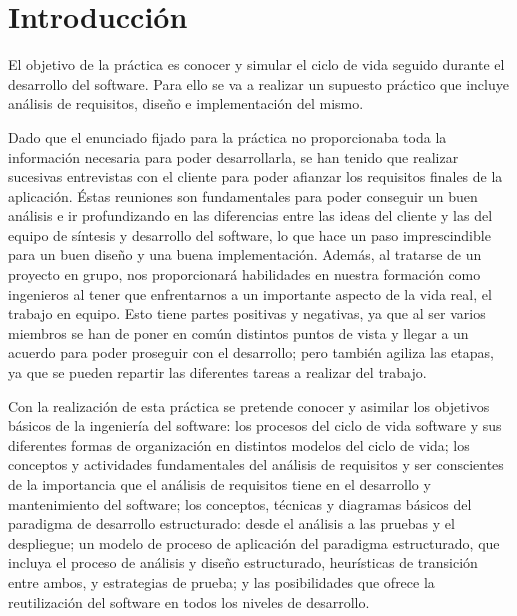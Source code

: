 \documentclass[12pt,a4paper,spanish,twoside]{article}
\begin{document}

\tableofcontents
\newpage
\section{Introducción}
El objetivo de la práctica es conocer y simular el ciclo de vida seguido
durante el desarrollo del software. Para ello se va a realizar un supuesto
práctico que incluye análisis de requisitos, diseño e implementación del
mismo. 

Dado que el enunciado fijado para la práctica no proporcionaba toda la
información necesaria para poder desarrollarla, se han tenido que realizar
sucesivas entrevistas con el cliente para poder afianzar los requisitos finales
de la aplicación. Éstas reuniones son fundamentales para poder conseguir un
buen análisis e ir profundizando en las diferencias entre las ideas del
cliente y las del equipo de síntesis y desarrollo del software, lo que hace
un paso imprescindible para un buen diseño y una buena
implementación. Además, al tratarse de un proyecto en grupo, nos
proporcionará habilidades en nuestra formación como ingenieros al tener que
enfrentarnos a un importante aspecto de la vida real, el trabajo en
equipo. Esto tiene partes positivas y negativas, ya que al ser varios
miembros se han de poner en común distintos puntos de vista y llegar a un
acuerdo para poder proseguir con el desarrollo; pero también agiliza las
etapas, ya que se pueden repartir las diferentes tareas a realizar del
trabajo. 

Con la realización de esta práctica se pretende conocer y asimilar los
objetivos básicos de la ingeniería del software: los procesos del ciclo de
vida software y sus diferentes formas de organización en distintos modelos
del ciclo de vida; los conceptos y actividades fundamentales del análisis
de requisitos y ser conscientes de la importancia que el análisis de
requisitos tiene en el desarrollo y mantenimiento del software; los conceptos,
técnicas y diagramas básicos del paradigma de desarrollo estructurado: desde
el análisis a las pruebas y el despliegue; un modelo de proceso de aplicación
del paradigma estructurado, que incluya el proceso de análisis y diseño
estructurado, heurísticas de transición entre ambos, y estrategias de prueba;
y las posibilidades que ofrece la reutilización del software en todos los
niveles de desarrollo. 
\end{document}
